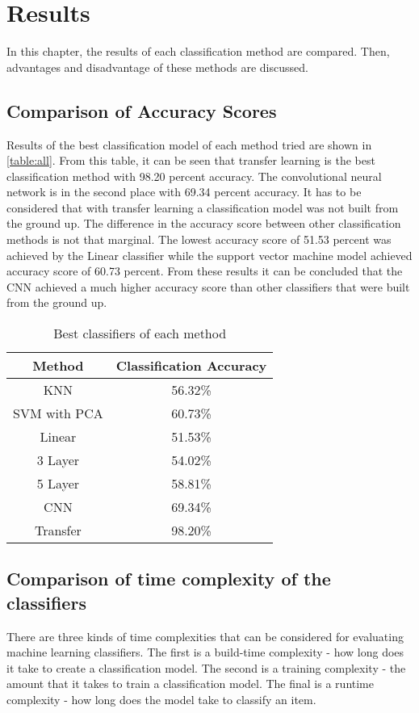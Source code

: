 
\chapter{Results}
In this chapter, the results of each classification method are compared. Then, advantages and disadvantage of these methods are discussed.

\section{Comparison of Accuracy Scores}

Results of the best classification model of each method tried are shown in  \autoref{table:all}. From this table, it can be seen that transfer learning is the best classification method with 98.20 percent accuracy. The convolutional neural network is in the second place with 69.34 percent accuracy. It has to be considered that with transfer learning a classification model was not built from the ground up. The difference in the  accuracy score between other classification methods is not that marginal. The lowest accuracy score of 51.53 percent was achieved by the Linear classifier while the support vector machine model achieved accuracy score of 60.73 percent.  From these results it can be concluded that the CNN achieved a much higher accuracy score than other classifiers that were built from the ground up.

\begin{table}[h]
\begin{center}
\begin{tabular}{ |c|c| } 
 \hline
Method &  Classification Accuracy \\   \hline
KNN    &  56.32\% \\
SVM with PCA   & 60.73\% \\
Linear   &    51.53\%  \\
3 Layer    &   54.02\% \\
5 Layer    &  58.81\% \\
CNN & 69.34\% \\
Transfer  &  98.20\% \\

 \hline
\end{tabular}
\caption{Best classifiers of each method}
\label{table:all}
\end{center}
\end{table}


\section{Comparison  of time complexity of the classifiers}
There are three kinds of time complexities that can be considered for evaluating machine learning classifiers. The first  is a build-time complexity - how long does it take to create a classification model. The second  is a training complexity - the amount that it takes to train a classification model. The final  is a runtime complexity - how long does the model take to classify an item. 

